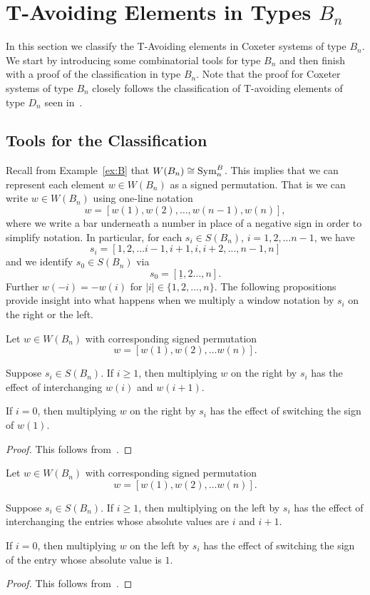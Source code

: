 \chapter{T-Avoiding Elements in Types $B_n$}\label{chap:BnandCn}

In this section we classify the T-Avoiding elements in Coxeter systems of type $B_n$. We start by introducing some combinatorial tools for type $B_n$ and then finish with a proof of the classification in type $B_n$. Note that the proof for Coxeter systems of type $B_n$ closely follows the classification of T-avoiding elements of type $D_n$ seen in~\cite{Gern2013a}.

\section{Tools for the Classification}

Recall from Example~\ref{ex:B} that $W(B_n) \cong \mathrm{Sym}_n^B$. This implies that we can represent each element $w \in W(B_n)$ as a signed permutation. That is we can write $w \in W(B_n)$ using one-line notation 
\[ w=[w(1),w(2), \ldots, w(n-1), w(n)], \]
where we write a bar underneath a number in place of a negative sign in order to simplify notation. In particular, for each $s_i \in S(B_n)$, $i=1,2,\ldots n-1$, we have
\[s_i=[1,2, \ldots i-1, i+1,i,i+2, \ldots, n-1,n] \] and we identify $s_0 \in S(B_n)$ via
\[s_0=[\underline{1}, 2 \ldots, n].\] Further $w(-i)=-w(i)$ for $|i| \in \{1,2, \ldots, n\}$. The following propositions provide insight into what happens when we multiply a window notation by $s_i$ on the right or the left.

\begin{proposition}
	Let $w \in W(B_n)$ with corresponding signed permutation 
	\[w=[w(1),w(2), \ldots w(n)].\]
	
	Suppose $s_i \in S(B_n)$. If $i \geq 1$, then multiplying $w$ on the right by $s_i$ has the effect of interchanging $w(i)$ and $w(i+1)$. 
		
	If $i=0$, then multiplying $w$ on the right by $s_i$ has the effect of switching the sign of $w(1)$. 	
	\begin{proof}
	This follows from~\cite[Section 8.1 and A3.1]{Bjorner2005}.	
	\end{proof}
\end{proposition}

\begin{proposition}
Let $w \in W(B_n)$ with corresponding signed permutation 
	\[w=[w(1),w(2), \ldots w(n)].\]
	
	Suppose $s_i \in S(B_n)$. If $i \geq 1$, then multiplying on the left by $s_i$ has the effect of interchanging the entries whose absolute values are $i$ and $i+1$.
	
	If $i=0$, then multiplying $w$ on the left by $s_i$ has the effect of switching the sign of the entry whose absolute value is $1$.
	\begin{proof}
	This follows from~\cite[Section 8.1 and A3.1]{Bjorner2005}.	
	\end{proof}
\end{proposition}

